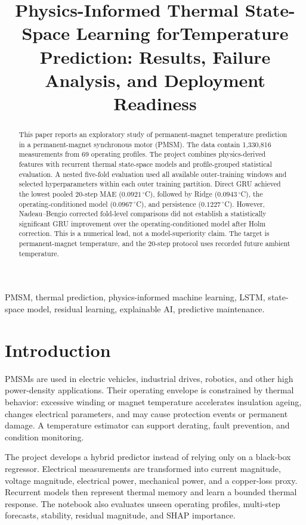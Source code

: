 \documentclass[conference]{IEEEtran}
\title{Physics-Informed Thermal State-Space Learning for\nPMSM Temperature Prediction: Results, Failure Analysis, and Deployment Readiness}
\author{\IEEEauthorblockN{Arjun Mitra}
\IEEEauthorblockA{Department of Electronics and Communication Engineering\\
St. Thomas' College of Engineering and Technology, Kolkata}}
\begin{document}
\maketitle

\begin{abstract}
This paper reports an exploratory study of permanent-magnet temperature
prediction in a permanent-magnet synchronous motor (PMSM). The data contain
1,330,816 measurements from 69 operating profiles. The project combines
physics-derived features with recurrent thermal state-space models and
profile-grouped statistical evaluation. A nested five-fold evaluation used
all available outer-training windows and selected hyperparameters within each
outer training partition. Direct GRU achieved the lowest pooled 20-step MAE
($0.0921\,^{\circ}$C), followed by Ridge ($0.0943\,^{\circ}$C), the
operating-conditioned model ($0.0967\,^{\circ}$C), and persistence
($0.1227\,^{\circ}$C). However, Nadeau--Bengio corrected fold-level
comparisons did not establish a statistically significant GRU improvement over
the operating-conditioned model after Holm correction. This is a numerical
lead, not a model-superiority claim. The target is permanent-magnet
temperature, and the 20-step protocol uses recorded future ambient temperature.
\end{abstract}

\begin{IEEEkeywords}
PMSM, thermal prediction, physics-informed machine learning, LSTM,
state-space model, residual learning, explainable AI, predictive maintenance.
\end{IEEEkeywords}

\section{Introduction}
PMSMs are used in electric vehicles, industrial drives, robotics, and other
high power-density applications. Their operating envelope is constrained by
thermal behavior: excessive winding or magnet temperature accelerates
insulation ageing, changes electrical parameters, and may cause protection
events or permanent damage. A temperature estimator can support derating,
fault prevention, and condition monitoring.

The project develops a hybrid predictor instead of relying only on a black-box
regressor. Electrical measurements are transformed into current magnitude,
voltage magnitude, electrical power, mechanical power, and a copper-loss
proxy. Recurrent models then represent thermal memory and learn a bounded
thermal response. The notebook also evaluates unseen operating profiles,
multi-step forecasts, stability, residual magnitude, and SHAP importance.
\end{document}
